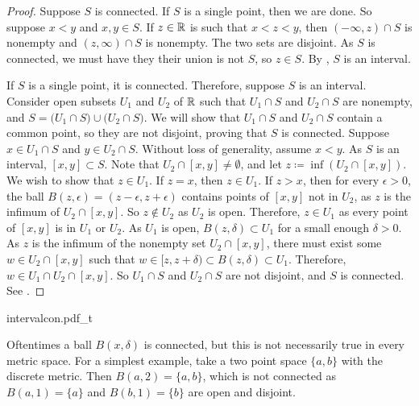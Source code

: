 \begin{proof}
Suppose $S$ is connected.  If $S$ is a single point,
then we are done.  So suppose $x < y$ and $x,y \in S$.  If $z \in {\mathbb{R}}$ is such
that $x < z < y$, then $(-\infty,z) \cap S$ is nonempty and $(z,\infty) \cap
S$ is nonempty.  The two sets are disjoint.  As
$S$ is connected, we must have they their union is not $S$, so $z \in S$.
By , $S$ is an interval.

If $S$ is a single point, it is connected.
Therefore, suppose $S$ is an interval.
Consider open subsets $U_1$ and $U_2$ of ${\mathbb{R}}$ such that
$U_1 \cap S$ and $U_2 \cap S$ are nonempty, and
$S = 
\bigl( U_1 \cap S \bigr)
\cup
\bigl( U_2 \cap S \bigr)$.  We will show that $U_1 \cap S$
and $U_2 \cap S$ contain a common point, so they are not disjoint,
proving that $S$ is connected.
Suppose $x \in U_1 \cap S$
and $y \in U_2 \cap S$.  Without loss of generality, assume $x < y$.
As $S$ is an interval, $[x,y] \subset S$.
Note that $U_2 \cap [x,y] \not= \emptyset$, and
let $z \coloneqq \inf (U_2 \cap [x,y])$.
We wish to show that $z \in U_1$.
If $z = x$, then $z \in U_1$.
If $z > x$,
then for every $\epsilon > 0$, the ball $B(z,\epsilon) =
(z-\epsilon,z+\epsilon)$ contains points of $[x,y]$ not in $U_2$,
as $z$ is the infimum of $U_2 \cap [x,y]$.
So $z \notin U_2$ as $U_2$ is open.
Therefore, $z \in U_1$ as every point of $[x,y]$ is in
$U_1$ or $U_2$.
As $U_1$ is open,
$B(z,\delta) \subset U_1$ for a small enough $\delta > 0$.
As $z$ is the infimum of the nonempty set $U_2 \cap [x,y]$, 
there must exist some $w \in U_2 \cap [x,y]$
such that $w \in [z,z+\delta) \subset B(z,\delta) \subset U_1$.
Therefore, $w \in U_1 \cap U_2 \cap [x,y]$.
So $U_1 \cap S$ and $U_2 \cap S$ are not disjoint, and
$S$ is connected.
See .
\end{proof}

\begin{myfigureht}
{intervalcon.pdf_t}
\caption{Proof that an interval is connected.\label{fig:intervalcon}}
\end{myfigureht}

\begin{example}
Oftentimes a ball $B(x,\delta)$ is connected, but this is not
necessarily true in every metric space.
For a simplest example,
take a two point space $\{ a, b\}$ with the discrete metric.
Then $B(a,2) = \{ a , b \}$, which is not
connected as $B(a,1) = \{ a \}$ and 
$B(b,1) = \{ b \}$ are open and disjoint.
\end{example}

